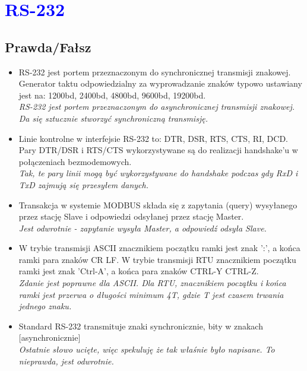 
\section{\textcolor{blue}{RS-232}}
\subsection*{Prawda/Fałsz}
\begin{itemize}
	\item \textcolor{nie}{RS-232 jest portem przeznaczonym do synchronicznej transmisji znakowej. Generator taktu odpowiedzialny za wyprowadzanie znaków typowo ustawiany jest na: 1200bd, 2400bd, 4800bd, 9600bd, 19200bd.} \\
	{\small \emph{RS-232 jest portem przeznaczonym do asynchronicznej transmisji znakowej. Da się sztucznie stworzyć synchroniczną transmisję.}}
	
	\item \textcolor{tak}{Linie kontrolne w interfejsie RS-232 to: DTR, DSR, RTS, CTS, RI, DCD. Pary DTR/DSR i RTS/CTS wykorzystywane są do realizacji handshake'u w połączeniach bezmodemowych.} \\ {\small \emph{Tak, te pary linii mogą być wykorzystywane do handshake podczas gdy RxD i TxD zajmują się przesyłem danych.}}
	
	\item \textcolor{nie}{Transakcja w systemie MODBUS składa się z zapytania (query) wysyłanego przez stację Slave i odpowiedzi odsyłanej przez stację Master.} \\
	{\small \emph {Jest odwrotnie - zapytanie wysyła Master, a odpowiedź odsyła Slave.}}
	
	\item \textcolor{nie}{W trybie transmisji ASCII znacznikiem początku ramki jest znak ':', a końca ramki para znaków CR LF. W trybie transmisji RTU znacznikiem początku ramki jest znak 'Ctrl-A', a końca para znaków CTRL-Y CTRL-Z.} \\
	{\small \emph{Zdanie jest poprawne dla ASCII. Dla RTU, znacznikiem początku i końca ramki jest przerwa o długości minimum 4T, gdzie T jest czasem trwania jednego znaku.}}
	
	\item \textcolor{nie}{Standard RS-232 transmituje znaki synchronicznie, bity w znakach [asynchronicznie]} \\
	{\small \emph{Ostatnie słowo ucięte, więc spekuluję że tak właśnie było napisane. To nieprawda, jest odwrotnie.}}
	

\end{itemize}
